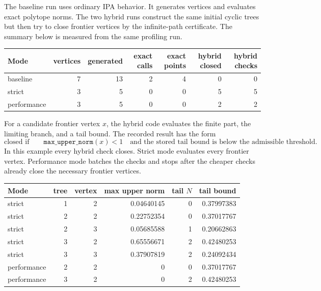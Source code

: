 \documentclass[11pt,a4paper]{scrartcl}
\begin{document}
        The baseline run uses ordinary IPA behavior.
        It generates vertices and evaluates exact polytope norms.
        The two hybrid runs construct the same initial cyclic trees but then try to close frontier vertices by the infinite-path certificate.
        The summary below is measured from the same profiling run.

        \begin{center}
            \begin{tabular}{lrrrrrr}
                \toprule
                Mode & vertices & generated & exact calls & exact points & hybrid closed & hybrid checks\\
                \midrule
                baseline & 7 & 13 & 2 & 4 & 0 & 0\\
                strict & 3 & 5 & 0 & 0 & 5 & 5\\
                performance & 3 & 5 & 0 & 0 & 2 & 2\\
                \bottomrule
            \end{tabular}
        \end{center}

        For a candidate frontier vertex $x$, the hybrid code evaluates the finite part, the limiting branch, and a tail bound.
        The recorded result has the form
        \[
            \text{closed if}\qquad
            \texttt{max\_upper\_norm}(x)<1
            \quad\text{and the stored tail bound is below the admissible threshold.}
        \]
        In this example every hybrid check closes.
        Strict mode evaluates every frontier vertex.
        Performance mode batches the checks and stops after the cheaper checks already close the necessary frontier vertices.

        \begin{center}
            \begin{tabular}{lrrrrr}
                \toprule
                Mode & tree & vertex & max upper norm & tail $N$ & tail bound\\
                \midrule
                strict & 1 & 2 & 0.04640145 & 0 & 0.37997383\\
                strict & 2 & 2 & 0.22752354 & 0 & 0.37017767\\
                strict & 2 & 3 & 0.05685588 & 1 & 0.20662863\\
                strict & 3 & 2 & 0.65556671 & 2 & 0.42480253\\
                strict & 3 & 3 & 0.37907819 & 2 & 0.24092434\\
                \midrule
                performance & 2 & 2 & 0 & 0 & 0.37017767\\
                performance & 3 & 2 & 0 & 2 & 0.42480253\\
                \bottomrule
            \end{tabular}
        \end{center}
\end{document}
